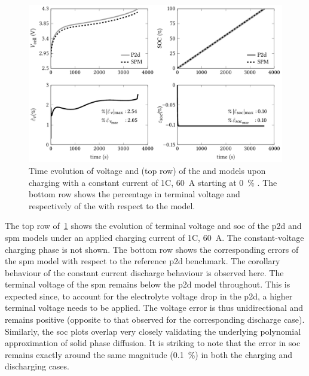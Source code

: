 \begin{figure}[!htb]
    \centering
    \includegraphics[width=\textwidth]{4/figures/const_curr_chg.pdf}
    \caption[Voltage and  evolution of  and
     for 1C constant current charging]{Time evolution of
        voltage and  (top row) of the  and
         models upon charging with a constant current of 1C,
        \ie{} \SI{60}{\ampere} starting at \SI{0}{\percent} .
        The bottom row shows the percentage in terminal voltage and
         respectively of the  with respect to
    the  model.}
    \label{fig:cnstchgspmp2d}
\end{figure}

The top row of~\cref{fig:cnstchgspmp2d} shows  the evolution of terminal voltage
and \gls{soc}  of the \gls{p2d} and  \gls{spm} models under an  applied charging
current of  1C, \ie{} \SI{60}{\ampere}.  The constant-voltage charging  phase is
not shown. The bottom row shows  the corresponding errors of the \gls{spm} model
with respect  to the reference  \gls{p2d} benchmark. The corollary  behaviour of
the constant current discharge behaviour  is observed here. The terminal voltage
of the \gls{spm} remains below the  \gls{p2d} model throughout. This is expected
since, to  account for the electrolyte  voltage drop in the  \gls{p2d}, a higher
terminal voltage needs  to be applied. The voltage error  is thus unidirectional
and remains positive (opposite to  that observed for the corresponding discharge
case).  Similarly,  the \gls{soc}  plots  overlap  very closely  validating  the
underlying polynomial approximation of solid  phase diffusion. It is striking to
note  that the  error in  \gls{soc} remains  exactly around  the same  magnitude
(\approx\SI{0.1}{\percent}) in both the charging and discharging cases.

